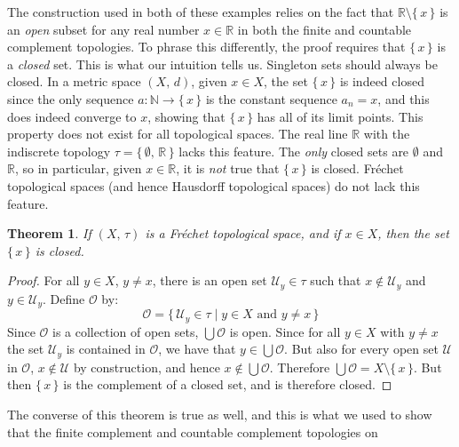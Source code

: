 \documentclass{article}
\theoremstyle{plain}
\newtheorem{theorem}{Theorem}[section]
\theoremstyle{normal}
\begin{document}
    The construction used in both of these examples relies on the fact that
    $\mathbb{R}\setminus\{\,x\,\}$ is an \textit{open} subset for any real
    number $x\in\mathbb{R}$ in both the finite and countable complement
    topologies. To phrase this differently, the proof requires that
    $\{\,x\,\}$ is a \textit{closed} set. This is what our intuition tells us.
    Singleton sets should always be closed. In a metric space $(X,\,d)$, given
    $x\in{X}$, the set $\{\,x\,\}$ is indeed closed since the only sequence
    $a:\mathbb{N}\rightarrow\{\,x\,\}$ is the constant sequence
    $a_{n}=x$, and this does indeed converge to $x$, showing that
    $\{\,x\,\}$ has all of its limit points. This property does not exist for
    all topological spaces. The real line $\mathbb{R}$ with the indiscrete
    topology $\tau=\{\,\emptyset,\,\mathbb{R}\,\}$ lacks this feature. The
    \textit{only} closed sets are $\emptyset$ and $\mathbb{R}$, so in
    particular, given $x\in\mathbb{R}$, it is \textit{not} true that
    $\{\,x\,\}$ is closed. Fr\'{e}chet topological spaces (and hence Hausdorff
    topological spaces) do not lack this feature.
    \begin{theorem}
        If $(X,\,\tau)$ is a Fr\'{e}chet topological space, and if $x\in{X}$,
        then the set $\{\,x\,\}$ is closed.
    \end{theorem}
    \begin{proof}
        For all $y\in{X}$, $y\ne{x}$, there is an open set
        $\mathcal{U}_{y}\in\tau$ such that $x\notin\mathcal{U}_{y}$ and
        $y\in\mathcal{U}_{y}$. Define $\mathcal{O}$ by:
        \begin{equation}
            \mathcal{O}=\{\,\mathcal{U}_{y}\in\tau\;|\;
                y\in{X}\textrm{ and }y\ne{x}\,\}
        \end{equation}
        Since $\mathcal{O}$ is a collection of open sets,
        $\bigcup\mathcal{O}$ is open. Since for all $y\in{X}$ with
        $y\ne{x}$ the set $\mathcal{U}_{y}$ is contained in $\mathcal{O}$,
        we have that $y\in\bigcup\mathcal{O}$. But also for every open set
        $\mathcal{U}$ in $\mathcal{O}$, $x\notin\mathcal{U}$ by construction,
        and hence $x\notin\bigcup\mathcal{O}$. Therefore
        $\bigcup\mathcal{O}=X\setminus\{\,x\,\}$. But then
        $\{\,x\,\}$ is the complement of a closed set, and is therefore closed.
    \end{proof}
    The converse of this theorem is true as well, and this is what we used to
    show that the finite complement and countable complement topologies on
\end{document}

